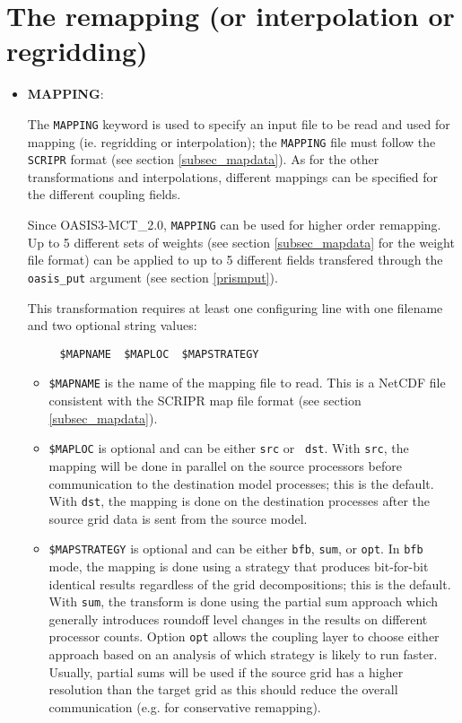 
\section{The remapping (or interpolation or regridding)}
\label{subsec_interp}

\begin{itemize}

\item {\bf MAPPING}:

  The {\tt MAPPING} keyword is used to specify an input file to be
  read and used for mapping (ie. regridding or interpolation); the
  {\tt MAPPING} file must follow the {\tt SCRIPR} format (see
    section \ref{subsec_mapdata}). As for the other transformations and interpolations, different mappings can be specified for the different coupling fields.
 
  Since OASIS3-MCT\_2.0, {\tt MAPPING} can be used for higher order
  remapping. Up to 5 different sets of weights (see section
  \ref{subsec_mapdata} for the weight file format) can be applied to
  up to 5 different fields transfered through the {\tt oasis\_put} argument
  (see section \ref{prismput}).

  This transformation requires at least one configuring line with one
  filename and two optional string values:
\begin{verbatim}
     $MAPNAME  $MAPLOC  $MAPSTRATEGY
\end{verbatim}
  \begin{itemize}
  \item {\tt \$MAPNAME} is the name of the mapping file to read.  This
    is a NetCDF file consistent with the SCRIPR map file format (see
    section \ref{subsec_mapdata}).

  \item {\tt \$MAPLOC} is optional and can be either {\tt src} or {\tt
      dst}.  With {\tt src}, the mapping will be done in parallel on
    the source processors before communication to the destination
    model processes; this is the default.  With {\tt dst}, the mapping
    is done on the destination processes after the source grid data is
    sent from the source model.

  \item {\tt \$MAPSTRATEGY} is optional and can be either {\tt bfb},
    {\tt sum}, or {\tt opt}.  In {\tt bfb} mode, the mapping is done
    using a strategy that produces bit-for-bit identical results
    regardless of the grid decompositions; this is the default.  With {\tt sum}, the
    transform is done using the partial sum approach which generally
    introduces roundoff level changes in the results on different
    processor counts. Option {\tt opt} allows the coupling layer to
    choose either approach based on an analysis of which strategy is
    likely to run faster. Usually, partial sums will be used if the
    source grid has a higher resolution than the target grid as this
    should reduce the overall communication (e.g. for conservative
    remapping).


\end{itemize}
\end{itemize}
